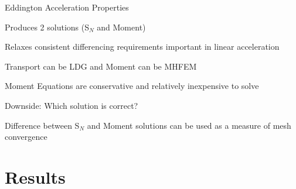 \documentclass[10pt]{beamer}
\newcommand{\SN}{S$_N$\xspace}
\begin{document}
\begin{frame}{Eddington Acceleration Properties}

	Produces 2 solutions (\SN and Moment)

	\pause
	Relaxes consistent differencing requirements important in linear acceleration 

	\pause 
	Transport can be LDG and Moment can be MHFEM 

	\pause 
	Moment Equations are conservative and relatively inexpensive to solve 

	\pause
	Downside: Which solution is correct? 

	\pause 
	Difference between \SN and Moment solutions can be used as a measure of mesh convergence 

\end{frame}

\section{Results}















\end{document}
